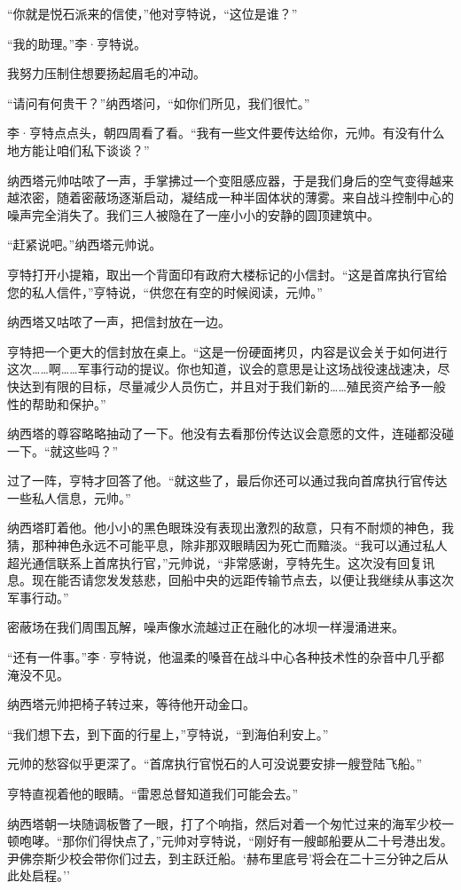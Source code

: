 \documentclass[AutoFakeBold=true]{book}
\begin{document}
``你就是悦石派来的信使，''他对亨特说，``这位是谁？''

``我的助理。''李·亨特说。

我努力压制住想要扬起眉毛的冲动。

``请问有何贵干？''纳西塔问，``如你们所见，我们很忙。''

李·亨特点点头，朝四周看了看。``我有一些文件要传达给你，元帅。有没有什么地方能让咱们私下谈谈？''

纳西塔元帅咕哝了一声，手掌拂过一个变阻感应器，于是我们身后的空气变得越来越浓密，随着密蔽场逐渐启动，凝结成一种半固体状的薄雾。来自战斗控制中心的噪声完全消失了。我们三人被隐在了一座小小的安静的圆顶建筑中。

``赶紧说吧。''纳西塔元帅说。

亨特打开小提箱，取出一个背面印有政府大楼标记的小信封。``这是首席执行官给您的私人信件，''亨特说，``供您在有空的时候阅读，元帅。''

纳西塔又咕哝了一声，把信封放在一边。

亨特把一个更大的信封放在桌上。``这是一份硬面拷贝，内容是议会关于如何进行这次……啊……军事行动的提议。你也知道，议会的意思是让这场战役速战速决，尽快达到有限的目标，尽量减少人员伤亡，并且对于我们新的……殖民资产给予一般性的帮助和保护。''

纳西塔的尊容略略抽动了一下。他没有去看那份传达议会意愿的文件，连碰都没碰一下。``就这些吗？''

过了一阵，亨特才回答了他。``就这些了，最后你还可以通过我向首席执行官传达一些私人信息，元帅。''

纳西塔盯着他。他小小的黑色眼珠没有表现出激烈的敌意，只有不耐烦的神色，我猜，那种神色永远不可能平息，除非那双眼睛因为死亡而黯淡。``我可以通过私人超光通信联系上首席执行官，''元帅说，``非常感谢，亨特先生。这次没有回复讯息。现在能否请您发发慈悲，回船中央的远距传输节点去，以便让我继续从事这次{\kaishu 军事行动}。''

密蔽场在我们周围瓦解，噪声像水流越过正在融化的冰坝一样漫涌进来。

``还有一件事。''李·亨特说，他温柔的嗓音在战斗中心各种技术性的杂音中几乎都淹没不见。

纳西塔元帅把椅子转过来，等待他开动金口。

``我们想下去，到下面的行星上，''亨特说，``到海伯利安上。''

元帅的愁容似乎更深了。``首席执行官悦石的人可没说要安排一艘登陆飞船。''

亨特直视着他的眼睛。``雷恩总督知道我们可能会去。''

纳西塔朝一块随调板瞥了一眼，打了个响指，然后对着一个匆忙过来的海军少校一顿咆哮。``那你们得快点了，''元帅对亨特说，``刚好有一艘邮船要从二十号港出发。尹佛奈斯少校会带你们过去，到主跃迁船。`赫布里底号'将会在二十三分钟之后从此处启程。''
\end{document}
